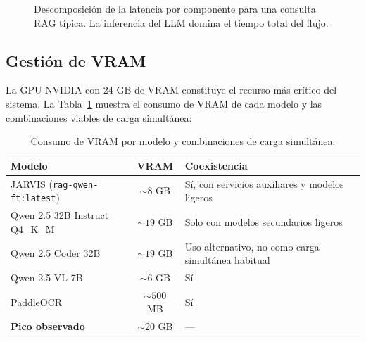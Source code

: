 \begin{figure}[H]
\centering
{}
\caption[Descomposición de la latencia por componente (consulta RAG).]{Descomposición de la latencia por componente para una consulta RAG típica. La inferencia del LLM domina el tiempo total del flujo.}
\label{fig:latencia-barras}
\end{figure}

\subsection{Gestión de VRAM}

La GPU NVIDIA con 24 GB de VRAM constituye el recurso más crítico del sistema. La Tabla~\ref{tab:vram-modelos} muestra el consumo de VRAM de cada modelo y las combinaciones viables de carga simultánea:

\begin{table}[H]
\centering
\small
\caption{Consumo de VRAM por modelo y combinaciones de carga simultánea.}
\label{tab:vram-modelos}
\begin{tabularx}{\textwidth}{>{\raggedright\arraybackslash}p{4.8cm} c >{\raggedright\arraybackslash}X}
\toprule
\textbf{Modelo} & \textbf{VRAM} & \textbf{Coexistencia} \\
\midrule
JARVIS (\texttt{rag-qwen-ft:latest})        & $\sim 8$ GB & Sí, con servicios auxiliares y modelos ligeros \\
Qwen 2.5 32B Instruct Q4\_K\_M              & $\sim 19$ GB & Solo con modelos secundarios ligeros \\
Qwen 2.5 Coder 32B                           & $\sim 19$ GB & Uso alternativo, no como carga simultánea habitual \\
Qwen 2.5 VL 7B                               & $\sim 6$ GB & Sí \\
PaddleOCR                      & $\sim 500$ MB & Sí \\
\midrule
\textbf{Pico observado} & $\sim 20$ GB & --- \\
\bottomrule
\end{tabularx}
\end{table}


